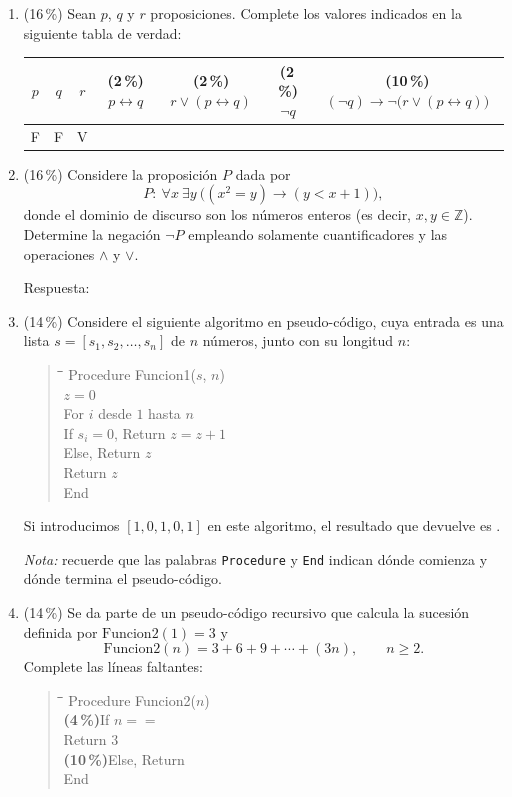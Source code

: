 \documentclass[11pt]{article}
\newcommand{\resp}{\underline{\hspace{2.5cm}}}
\newenvironment{pseudo}{%
  \begin{quote}\ttfamily\small\begin{tabbing}
  \hspace{2em}\=\hspace{2em}\=\hspace{2em}\=\kill}{%
  \end{tabbing}\end{quote}}
\begin{document}
\begin{enumerate}
\item (16\,\%) Sean $p$, $q$ y $r$ proposiciones. Complete los valores indicados en la siguiente tabla de verdad:
\begin{center}
\begin{tabular}{|c|c|c||c|c|c|c|}
\hline
$p$ & $q$ & $r$ & \small(2\,\%) $p \leftrightarrow q$ & \small(2\,\%) $r \vee (p \leftrightarrow q)$ & \small(2\,\%) $\neg q$ & \small(10\,\%) $(\neg q) \to \neg\bigl(r \vee (p \leftrightarrow q)\bigr)$ \\
\hline
F & F & V & & & & \\
\hline
\end{tabular}
\end{center}

\item (16\,\%) Considere la proposición $P$ dada por
\[
P : \ \forall x\ \exists y\ \bigl((x^2 = y) \to (y < x + 1)\bigr),
\]
donde el dominio de discurso son los números enteros (es decir, $x, y \in \mathbb{Z}$). Determine la negación $\neg P$ empleando solamente cuantificadores y las operaciones $\wedge$ y $\vee$.

\vspace{4pt}
Respuesta: \underline{\hspace{9cm}}

\item (14\,\%) Considere el siguiente algoritmo en pseudo-código, cuya entrada es una lista $s = [s_1, s_2, \dots, s_n]$ de $n$ números, junto con su longitud $n$:
\begin{pseudo}
Procedure Funcion1($s$, $n$)\\
\>$z = 0$\\
\>For $i$ desde $1$ hasta $n$\\
\>\>If $s_i = 0$, Return $z = z + 1$\\
\>\>Else, Return $z$\\
\>Return $z$\\
End
\end{pseudo}
Si introducimos $[1, 0, 1, 0, 1]$ en este algoritmo, el resultado que devuelve es \resp.

\emph{Nota:} recuerde que las palabras \texttt{Procedure} y \texttt{End} indican dónde comienza y dónde termina el pseudo-código.

\item (14\,\%) Se da parte de un pseudo-código recursivo que calcula la sucesión definida por $\text{Funcion2}(1) = 3$ y
\[
\text{Funcion2}(n) = 3 + 6 + 9 + \cdots + (3n), \qquad n \geq 2.
\]
Complete las líneas faltantes:
\begin{pseudo}
Procedure Funcion2($n$)\\
\>\textbf{(4\,\%)}\quad If $n ==$ \resp\\
\>\>Return $3$\\
\>\textbf{(10\,\%)}\quad Else, Return \underline{\hspace{5cm}}\\
End
\end{pseudo}


\end{enumerate}
\end{document}
